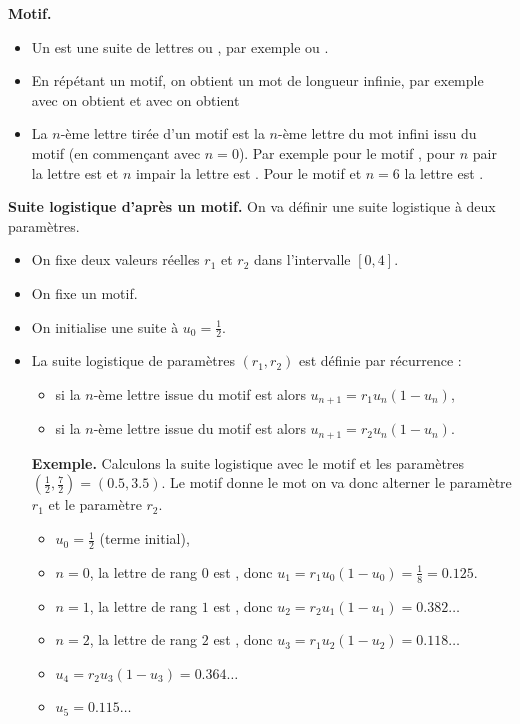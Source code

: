\documentclass[11pt,class=report,crop=false]{standalone}
\begin{document}

\begin{cours}

\textbf{Motif.} 
\begin{itemize}
  \item Un  est une suite de lettres  ou , par exemple  ou .
  \item En répétant un motif, on obtient un mot de longueur infinie, par exemple avec
   on obtient  et avec  on obtient 
  \item La $n$-ème lettre tirée d'un motif est la $n$-ème lettre du mot infini issu du motif (en commençant avec $n=0$). Par exemple pour le motif , pour $n$ pair la lettre est  et $n$ impair la lettre est . Pour le motif  et $n=6$ la lettre est .
\end{itemize}

\bigskip

\textbf{Suite logistique d'après un motif.}
On va définir une suite logistique à deux paramètres.
\begin{itemize}
  \item On fixe deux valeurs réelles $r_1$ et $r_2$ dans l'intervalle $[0,4]$.
  \item On fixe un motif.
  \item On initialise une suite à $u_0 = \frac12$.
  \item La suite logistique de paramètres $(r_1,r_2)$ est définie par récurrence :
  \begin{itemize}
    \item si la $n$-ème lettre issue du motif est  alors $u_{n+1} = r_1u_n(1-u_n)$,
    \item si la $n$-ème lettre issue du motif est  alors $u_{n+1} = r_2u_n(1-u_n)$.
  \end{itemize}
  
\bigskip

\textbf{Exemple.} 
Calculons la suite logistique avec le motif  et les paramètres $(\frac12,\frac72) = (0.5,3.5)$. 
Le motif donne le mot  on va donc alterner le paramètre $r_1$ et le paramètre $r_2$.
\begin{itemize}
  \item $u_0 = \frac 12$ (terme initial),
  \item $n=0$, la lettre de rang $0$ est , donc $u_1 = r_1 u_0 (1-u_0) = \frac18 = 0.125$.
  \item $n=1$, la lettre de rang $1$ est , donc 
  $u_2 = r_2 u_1 (1-u_1) = 0.382\ldots$
  \item $n=2$, la lettre de rang $2$ est , donc $u_3 = r_1 u_2 (1-u_2) = 0.118\ldots$
  \item $u_4 = r_2 u_3 (1-u_3) = 0.364\ldots$
  \item $u_5 = 0.115\ldots$
\end{itemize}


\end{itemize}
\end{cours}
\end{document}
